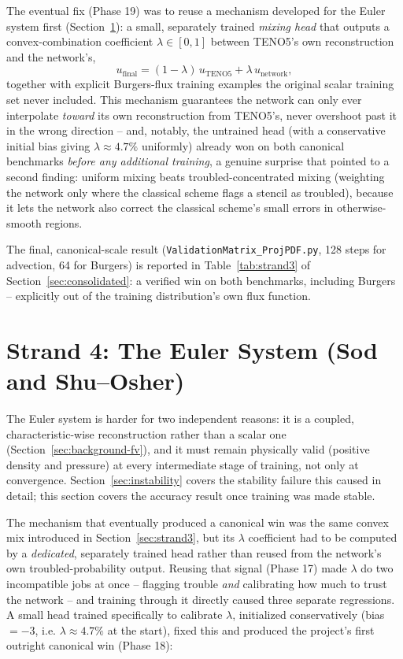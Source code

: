 \documentclass[11pt]{article}
\begin{document}
The eventual fix (Phase 19) was to reuse a mechanism developed for the
Euler system first (Section~\ref{sec:strand4}): a small, separately
trained \emph{mixing head} that outputs a convex-combination coefficient
$\lambda \in [0,1]$ between TENO5's own reconstruction and the network's,
\[
u_{\text{final}} = (1-\lambda)\, u_{\text{TENO5}} + \lambda\, u_{\text{network}},
\]
together with explicit Burgers-flux training examples the original scalar
training set never included. This mechanism guarantees the network can
only ever interpolate \emph{toward} its own reconstruction from TENO5's,
never overshoot past it in the wrong direction -- and, notably, the
untrained head (with a conservative initial bias giving $\lambda \approx
4.7\%$ uniformly) already won on both canonical benchmarks \emph{before any
additional training}, a genuine surprise that pointed to a second finding:
uniform mixing beats troubled-concentrated mixing (weighting the network
only where the classical scheme flags a stencil as troubled), because it
lets the network also correct the classical scheme's small errors in
otherwise-smooth regions.

The final, canonical-scale result (\texttt{ValidationMatrix\_ProjPDF.py},
128 steps for advection, 64 for Burgers) is reported in
Table~\ref{tab:strand3} of Section~\ref{sec:consolidated}: a verified win
on both benchmarks, including Burgers -- explicitly out of the training
distribution's own flux function.

\section{Strand 4: The Euler System (Sod and Shu--Osher)}
\label{sec:strand4}

The Euler system is harder for two independent reasons: it is a coupled,
characteristic-wise reconstruction rather than a scalar one
(Section~\ref{sec:background-fv}), and it must remain physically valid
(positive density and pressure) at every intermediate stage of training,
not only at convergence. Section~\ref{sec:instability} covers the
stability failure this caused in detail; this section covers the accuracy
result once training was made stable.

The mechanism that eventually produced a canonical win was the same convex
mix introduced in Section~\ref{sec:strand3}, but its $\lambda$ coefficient
had to be computed by a \emph{dedicated}, separately trained head rather
than reused from the network's own troubled-probability output. Reusing
that signal (Phase 17) made $\lambda$ do two incompatible jobs at once --
flagging trouble \emph{and} calibrating how much to trust the network --
and training through it directly caused three separate regressions. A
small head trained specifically to calibrate $\lambda$, initialized
conservatively (bias $=-3$, i.e. $\lambda \approx 4.7\%$ at the start),
fixed this and produced the project's first outright canonical win
(Phase 18):
\end{document}
